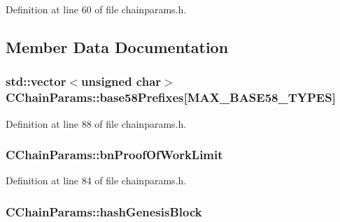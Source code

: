 Definition at line 60 of file chainparams.\+h.



\subsection{Member Data Documentation}
\hypertarget{class_c_chain_params_a923d956c5d3891d0c682b7ef5410ed8f}{}
\subsubsection[{base58\+Prefixes}]{\setlength{\rightskip}{0pt plus 5cm}std\+::vector$<$unsigned char$>$ C\+Chain\+Params\+::base58\+Prefixes\mbox{[}{\bf M\+A\+X\+\_\+\+B\+A\+S\+E58\+\_\+\+T\+Y\+P\+E\+S}\mbox{]}\hspace{0.3cm}{\ttfamily [protected]}}\label{class_c_chain_params_a923d956c5d3891d0c682b7ef5410ed8f}


Definition at line 88 of file chainparams.\+h.

\hypertarget{class_c_chain_params_a31b98a48c662682f3e94564e1fa08608}{}
\subsubsection[{bn\+Proof\+Of\+Work\+Limit}]{ C\+Chain\+Params\+::bn\+Proof\+Of\+Work\+Limit\hspace{0.3cm}{\ttfamily [protected]}}\label{class_c_chain_params_a31b98a48c662682f3e94564e1fa08608}


Definition at line 84 of file chainparams.\+h.

\hypertarget{class_c_chain_params_a3033bae1b7e966358f80b6cbb2e2a3d8}{}
\subsubsection[{hash\+Genesis\+Block}]{ C\+Chain\+Params\+::hash\+Genesis\+Block\hspace{0.3cm}{\ttfamily [protected]}}\label{class_c_chain_params_a3033bae1b7e966358f80b6cbb2e2a3d8}


